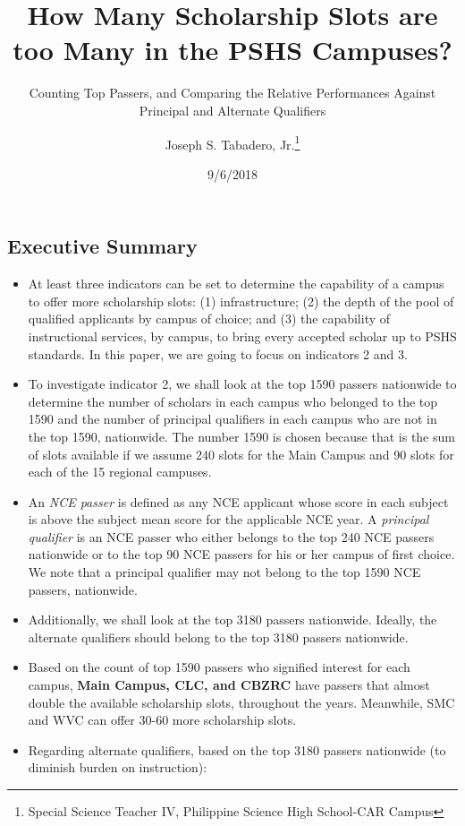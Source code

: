 \documentclass[]{article}
\title{How Many Scholarship Slots are too Many in the PSHS Campuses?}
\subtitle{Counting Top Passers, and Comparing the Relative Performances Against
Principal and Alternate Qualifiers}
\author{Joseph S. Tabadero,
Jr.\thanks{Special Science Teacher IV, Philippine Science High School-CAR Campus}}
\date{9/6/2018}
\providecommand{\tightlist}{%
  \setlength{\itemsep}{0pt}\setlength{\parskip}{0pt}}
\begin{document}
\maketitle

{
\setcounter{tocdepth}{3}
\tableofcontents
}
\hypertarget{executive-summary}{%
\subsection{Executive Summary}\label{executive-summary}}

\begin{itemize}
\tightlist
\item
  At least three indicators can be set to determine the capability of a
  campus to offer more scholarship slots: (1) infrastructure; (2) the
  depth of the pool of qualified applicants by campus of choice; and (3)
  the capability of instructional services, by campus, to bring every
  accepted scholar up to PSHS standards. In this paper, we are going to
  focus on indicators 2 and 3.
\item
  To investigate indicator 2, we shall look at the top 1590 passers
  nationwide to determine the number of scholars in each campus who
  belonged to the top 1590 and the number of principal qualifiers in
  each campus who are not in the top 1590, nationwide. The number 1590
  is chosen because that is the sum of slots available if we assume 240
  slots for the Main Campus and 90 slots for each of the 15 regional
  campuses.
\item
  An \emph{NCE passer} is defined as any NCE applicant whose score in
  each subject is above the subject mean score for the applicable NCE
  year. A \emph{principal qualifier} is an NCE passer who either belongs
  to the top 240 NCE passers nationwide or to the top 90 NCE passers for
  his or her campus of first choice. We note that a principal qualifier
  may not belong to the top 1590 NCE passers, nationwide.
\item
  Additionally, we shall look at the top 3180 passers nationwide.
  Ideally, the alternate qualifiers should belong to the top 3180
  passers nationwide.
\item
  Based on the count of top 1590 passers who signified interest for each
  campus, \textbf{Main Campus, CLC, and CBZRC} have passers that almost
  double the available scholarship slots, throughout the years.
  Meanwhile, SMC and WVC can offer 30-60 more scholarship slots.
\item
  Regarding alternate qualifiers, based on the top 3180 passers
  nationwide (to diminish burden on instruction):


\end{itemize}
\end{document}

